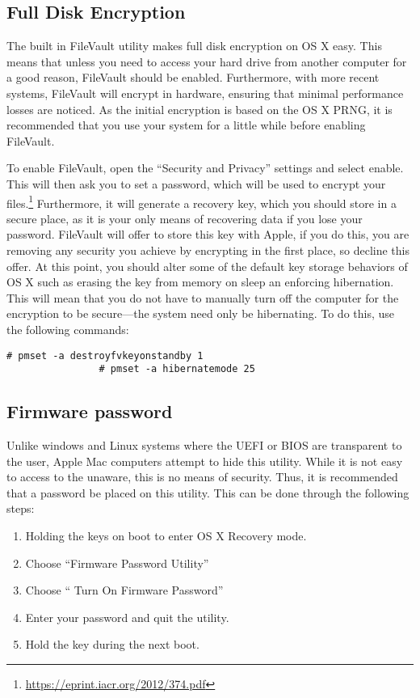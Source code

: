 		\subsection{Full Disk Encryption}
			The built in FileVault utility makes full disk encryption on OS X easy.
			This means that unless you need to access your hard drive from another computer for a good reason, FileVault should be enabled.
			Furthermore, with more recent systems, FileVault will encrypt in hardware, ensuring that minimal performance losses are noticed.
			As the initial encryption is based on the OS X PRNG, it is recommended that you use your system for a little while before enabling FileVault.

			To enable FileVault, open the ``Security and Privacy'' settings and select enable.
			This will then ask you to set a password, which will be used to encrypt your files.\footnote{\url{https://eprint.iacr.org/2012/374.pdf}}
			Furthermore, it will generate a recovery key, which you should store in a secure place, as it is your only means of recovering data if you lose your password.
			FileVault will offer to store this key with Apple, if you do this, you are removing any security you achieve by encrypting in the first place, so decline this offer.
			At this point, you should alter some of the default key storage behaviors of OS X such as erasing the key from memory on sleep an enforcing hibernation.
			This will mean that you do not have to manually turn off the computer for the encryption to be secure---the system need only be hibernating.
			To do this, use the following commands:
			\begin{lstlisting}[style=CLI]
				# pmset -a destroyfvkeyonstandby 1
				# pmset -a hibernatemode 25
			\end{lstlisting}
		\subsection{Firmware password}
			Unlike windows and Linux systems where the UEFI or BIOS are transparent to the user, Apple Mac computers attempt to hide this utility.
			While it is not easy to access to the unaware, this is no means of security.
			Thus, it is recommended that a password be placed on this utility.
			This can be done through the following steps:
			\begin{enumerate}
				\item Holding the keys  on boot to enter OS X Recovery mode.
				\item Choose ``Firmware Password Utility''
				\item Choose `` Turn On Firmware Password''
				\item Enter your password and quit the utility.
				\item Hold the \Alt{} key during the next boot.
			\end{enumerate}
